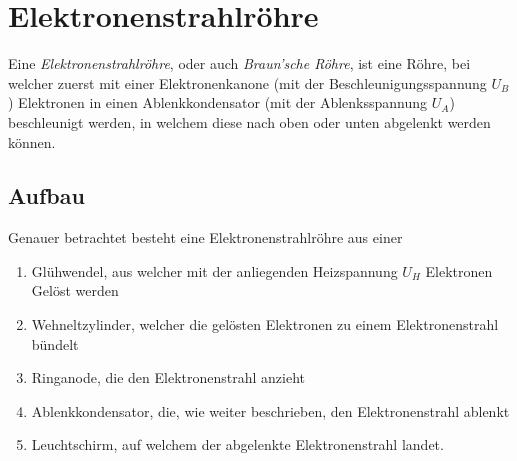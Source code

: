 \documentclass{article}
\begin{document}
\section{Elektronenstrahlröhre}
Eine \emph{Elektronenstrahlröhre}, oder auch \emph{Braun'sche Röhre}, ist eine Röhre, bei welcher zuerst mit einer Elektronenkanone (mit der Beschleunigungsspannung $U_B$) Elektronen in einen Ablenkkondensator (mit der Ablenksspannung $U_A$) beschleunigt werden, in welchem diese nach oben oder unten abgelenkt werden können.
 
\subsection{Aufbau}
Genauer betrachtet besteht eine Elektronenstrahlröhre aus einer
\begin{enumerate}
 \item{Glühwendel}, aus welcher mit der anliegenden Heizspannung $U_H$ Elektronen Gelöst werden
 \item{Wehneltzylinder}, welcher die gelösten Elektronen zu einem Elektronenstrahl bündelt
 \item{Ringanode}, die den Elektronenstrahl anzieht
 \item{Ablenkkondensator}, die, wie weiter beschrieben, den Elektronenstrahl ablenkt
 \item{Leuchtschirm}, auf welchem der abgelenkte Elektronenstrahl landet. 
\end{enumerate} 
 
\end{document}
